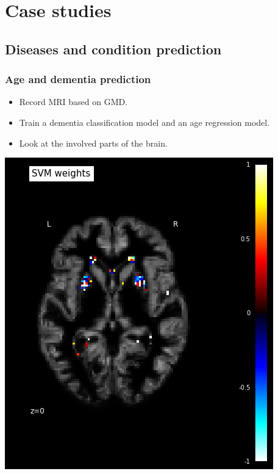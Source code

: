\documentclass{beamer}
\begin{document}

\section{Case studies}

\subsection{Diseases and condition prediction}

\begin{frame}
\frametitle{Age and dementia prediction}
\begin{minipage}{.45\linewidth}
\begin{itemize}
\item Record MRI based on GMD.
\item Train a dementia classification model and an age regression model.
\item Look at the involved parts of the brain.
\end{itemize}
\end{minipage}
\hfill
\begin{minipage}{.45\linewidth}
\includegraphics[scale=.3]{agepred.png}
\end{minipage}
\end{frame}
\end{document}
